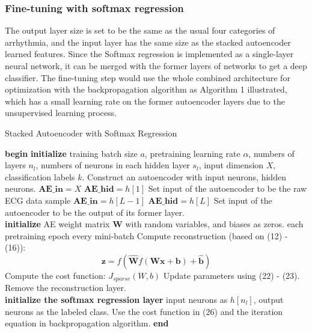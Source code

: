 \documentclass{bmcart}
\begin{document}
\subsubsection*{Fine-tuning with softmax regression}
The output layer size is set to be the same as the usual four categories of arrhythmia, and the input layer has the same size as the stacked autoencoder learned features. Since the Softmax regression is implemented as a single-layer neural network, it can be merged with the former layers of networks to get a deep classifier. The fine-tuning step would use the whole combined architecture for optimization with the backpropagation algorithm as Algorithm 1 illustrated, which has a small learning rate on the former autoencoder layers due to the unsupervised learning process.


\begin{algorithm}
\caption{Stacked Autoencoder with  Softmax Regression}
\begin{algorithmic}[1]
\State \textbf{begin}
	\State \textbf{initialize} training batch size $a$, pretraining learning rate $\alpha$, numbers of layers $n_l$, numbers of neurons in each hidden layer $s_l$, input dimension $X$, classification labels $k$.
		\State Construct an autoencoder with  input neurons, hidden neurons.
			\State $\textbf{AE\_in} = X$
			\State $\textbf{AE\_hid} = h[1]$
			\State Set input of the autoencoder to be the raw ECG data sample
		\Else
			\State $\textbf{AE\_in} = h[L-1]$
			\State $\textbf{AE\_hid} =h[L]$
			\State Set input of the autoencoder to be the output of its former layer.
		\EndIf
	\EndFor
\\
	\State \textbf{initialize} AE weight matrix $\mathbf{W}$ with random variables, and biases as zeros.
	\For each pretraining epoch
		\For every mini-batch
			\State Compute reconstruction (based on (12) - (16)):
			\begin{equation}
				\mathbf{z} = f(\hat{\mathbf W}f(\mathbf W\mathbf x+\mathbf b)+\mathbf {\hat{b}})
			\end{equation}
			\State Compute the cost function: $J_{sparse}(W, b)$
			\State Update parameters using (22) - (23).
		\EndFor
	\EndFor
	\State Remove the reconstruction layer.
\\
	\State \textbf{initialize the softmax regression layer} input neurons as $h[n_l]$, output neurons as the labeled class.
			\State Use the cost function in (26) and the iteration equation in backpropagation algorithm.
		\EndFor
	\EndFor
\State \textbf{end}
\end{algorithmic}
\end{algorithm}
\end{document}
